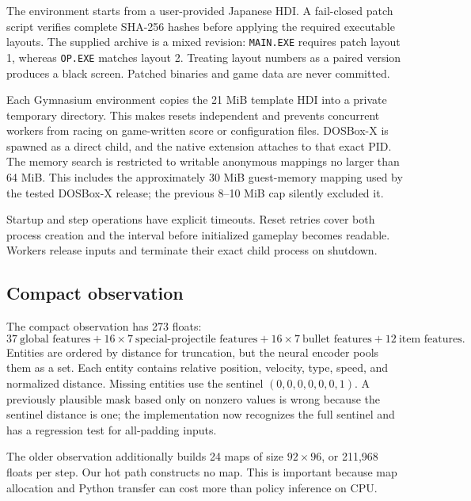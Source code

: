 \documentclass[10pt]{article}
\begin{document}
The environment starts from a user-provided Japanese HDI.  A fail-closed patch
script verifies complete SHA-256 hashes before applying the required executable
layouts.  The supplied archive is a mixed revision: \texttt{MAIN.EXE} requires
patch layout 1, whereas \texttt{OP.EXE} matches layout 2.  Treating layout
numbers as a paired version produces a black screen.  Patched binaries and game
data are never committed.

Each Gymnasium environment copies the 21 MiB template HDI into a private
temporary directory.  This makes resets independent and prevents concurrent
workers from racing on game-written score or configuration files.  DOSBox-X is
spawned as a direct child, and the native extension attaches to that exact PID.
The memory search is restricted to writable anonymous mappings no larger than
64 MiB.  This includes the approximately 30 MiB guest-memory mapping used by the
tested DOSBox-X release; the previous 8--10 MiB cap silently excluded it.

Startup and step operations have explicit timeouts.  Reset retries cover both
process creation and the interval before initialized gameplay becomes readable.
Workers release inputs and terminate their exact child process on shutdown.

\subsection{Compact observation}

The compact observation has 273 floats:
\begin{equation}
  37\ \text{global features}
  + 16\!\times\!7\ \text{special-projectile features}
  + 16\!\times\!7\ \text{bullet features}
  + 12\ \text{item features}.
\end{equation}
Entities are ordered by distance for truncation, but the neural encoder pools
them as a set.  Each entity contains relative position, velocity, type, speed,
and normalized distance.  Missing entities use the sentinel
$(0,0,0,0,0,0,1)$.  A previously plausible mask based only on nonzero values is
wrong because the sentinel distance is one; the implementation now recognizes
the full sentinel and has a regression test for all-padding inputs.

The older observation additionally builds 24 maps of size $92\times96$, or
211,968 floats per step.  Our hot path constructs no map.  This is important
because map allocation and Python transfer can cost more than policy inference
on CPU.
\end{document}
